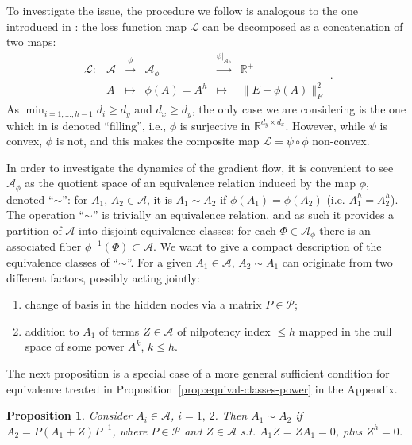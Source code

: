 \documentclass{article}
\newtheorem{proposition}{Proposition}
\newcommand{\1}{\mathds{1}}
\newcommand{\benu}{\begin{enumerate}}
\newcommand{\eenu}{\end{enumerate}}
\begin{document}
To investigate the issue, the procedure we  follow is analogous to the one introduced in \cite{trager2019pure}: the loss function map $ \mathcal{L} $ can be decomposed as a concatenation of two maps:
\[
\begin{array}{rccccc}
\mathcal{L}  : & \mathcal{A} & \stackrel{\phi} {\longrightarrow}  & \mathcal{A}_\phi & \stackrel{\left. \psi \right|_{\mathcal{A}_\phi}} {\longrightarrow} & \mathbb{R}^+\\
& A & \longmapsto & \phi(A)=A^h & \longmapsto & \|E - \phi(A) \|_F^2 
\end{array} .
\]
As $ \min_{i=1,\ldots, h-1} d_i \geq d_y $ and $ d_x \geq d_y$, the only case we are considering is the one which in \cite{trager2019pure} is denoted ``filling'', i.e., $ \phi $ is surjective in $ \mathbb{R}^{d_y \times d_x}$.  
However, while $ \psi$ is convex, $ \phi $ is not, and this makes the composite map $ \mathcal{L} = \psi \circ \phi $ non-convex.

In order to investigate the dynamics of the gradient flow, it is convenient to see $ \mathcal{A}_\phi $ as the quotient space of an equivalence relation induced by the map $  \phi $, denoted ``$ \sim $'': for $ A_1, \,  A_2 \in \mathcal{A} $, it is $ A_1 \sim A_2 $ if  $\phi(A_1)  = \phi(A_2) $  (i.e. $ A_1^h = A_2^h $).
The operation ``$ \sim$'' is trivially an equivalence relation, and as such it provides a partition of $ \mathcal{A}$ into disjoint equivalence classes: for each $ \Phi \in \mathcal{A}_\phi$ there is an associated fiber $ \phi^{-1}(\Phi)\subset \mathcal{A} $.
We want to give a compact description of the equivalence classes of ``$ \sim $''. For a given $ A_1 \in \mathcal{A} $, $A_2 \sim A_1 $ can originate from two different factors, possibly acting jointly:
\benu
\item change of basis in the hidden nodes via a matrix $ P \in \mathcal{P}$;
\item addition to $ A_1 $ of terms $ Z \in \mathcal{A} $ of nilpotency index $ \leq h$ mapped in the null space of some power $ A^k $, $ k\leq h $.
\eenu


The next proposition is a special case of a more general sufficient condition for equivalence treated in Proposition~\ref{prop:equival-classes-power} in the Appendix. 
\begin{proposition}
\label{prop:equival-classes-A}
Consider $ A_i\in \mathcal{A}$, $i=1,\, 2$.
Then $ A_1 \sim A_2 $ if $ A_2 = P (A_1 + Z ) P^{-1} $, where $ P \in \mathcal{P} $ and $ Z \in \mathcal{A} $ s.t. $ A_1 Z = Z A_1 =0 $, plus $ Z^h =0$.
\end{proposition}
\end{document}

